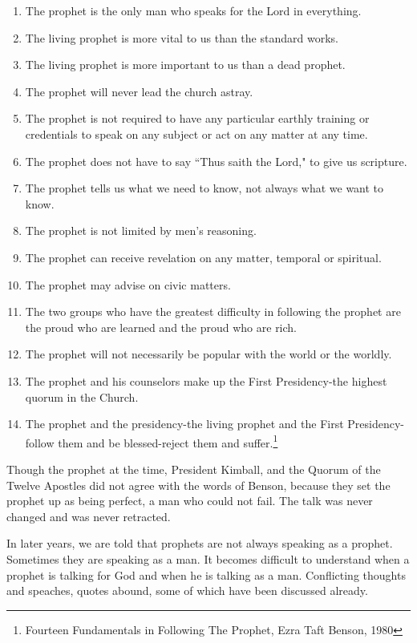 \begin{displayquote}
\begin{enumerate}
\item The prophet is the only man who speaks for the Lord in everything.
\item The living prophet is more vital to us than the standard works.
\item The living prophet is more important to us than a dead prophet.
\item The prophet will never lead the church astray.
\item The prophet is not required to have any particular earthly training or 
credentials to speak on any subject or act on any matter at any time.
\item The prophet does not have to say ``Thus saith the Lord," to give us scripture.
\item The prophet tells us what we need to know, not always what we want to know.
\item The prophet is not limited by men's reasoning.
\item The prophet can receive revelation on any matter, temporal or spiritual.
\item The prophet may advise on civic matters.
\item The two groups who have the greatest difficulty in following the prophet are 
the proud who are learned and the proud who are rich.
\item The prophet will not necessarily be popular with the world or the worldly.
\item The prophet and his counselors make up the First Presidency-the highest 
quorum in the Church.
\item The prophet and the presidency-the living prophet and the First 
Presidency-follow them and be blessed-reject them and suffer.\footnote{Fourteen 
Fundamentals in Following The Prophet, Ezra Taft Benson, 1980}
\end{enumerate}
\end{displayquote}

Though the prophet at the time, President Kimball, and the Quorum of the Twelve
Apostles did not agree with the words of Benson, because they set the prophet up as
being perfect, a man who could not fail. The talk was never changed and was never
retracted.

In later years, we are told that prophets are not always speaking as a prophet.
Sometimes they are speaking as a man. It becomes difficult to understand when a
prophet is talking for God and when he is talking as a man. Conflicting thoughts and
speaches, quotes abound, some of which have been discussed already.

